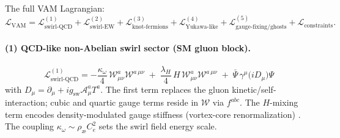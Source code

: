 \documentclass[11pt]{article}
\begin{document}
    The full VAM Lagrangian:
    \[
        \mathcal{L}_\text{VAM}=\mathcal{L}^{(1)}_{\text{swirl-QCD}}
        +\mathcal{L}^{(2)}_{\text{swirl-EW}}
        +\mathcal{L}^{(3)}_{\text{knot-fermions}}
        +\mathcal{L}^{(4)}_{\text{Yukawa-like}}
        +\mathcal{L}^{(5)}_{\text{gauge-fixing/ghosts}}
        +\mathcal{L}_\text{constraints}.
    \]

    \paragraph{(1) QCD-like non-Abelian swirl sector (SM gluon block).}
    \[
        \boxed{\ \mathcal{L}^{(1)}_{\text{swirl-QCD}}
            = -\frac{\kappa_\omega}{4}\, \mathcal{W}^a_{\mu\nu}\mathcal{W}^{a\,\mu\nu}
            \;+\; \frac{\lambda_H}{4}\, H\, \mathcal{W}^a_{\mu\nu}\mathcal{W}^{a\,\mu\nu}
            \;+\; \bar{\Psi}\, \gamma^\mu \big(i D_\mu\big)\Psi\ }
    \]
    with \(D_\mu=\partial_\mu+i g_\text{sw} \mathcal{A}_\mu^a T^a\).
    The first term replaces the gluon kinetic/self-interaction; cubic and quartic gauge terms reside in \(\mathcal{W}\) via \(f^{abc}\). The \(H\)-mixing term encodes density-modulated gauge stiffness (vortex-core renormalization) \cite{Iskandarani2025EmergentGR,Iskandarani2025TopLag}.
    The coupling \(\kappa_\omega\sim \rho_\text{\ae} C_e^2\) sets the swirl field energy scale.

\end{document}
